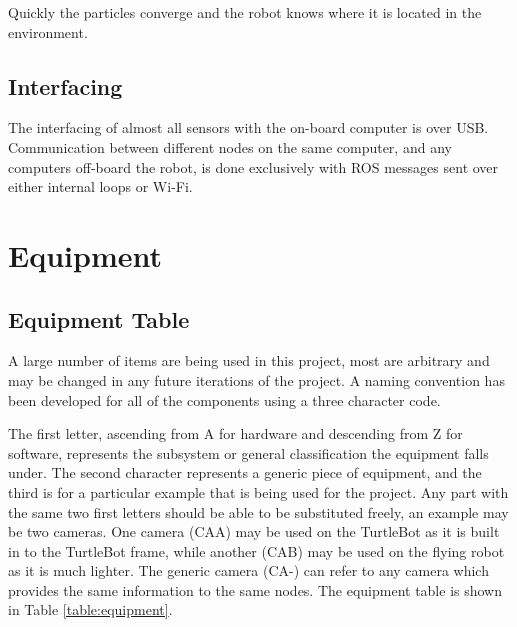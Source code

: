 \documentclass{article}[12]
\begin{document}
		Quickly the particles converge and the robot knows where it is located in the environment.

	\subsection{Interfacing}
	
	The interfacing of almost all sensors with the on-board computer is over USB. Communication between different nodes on the same computer, and any computers off-board the robot, is done exclusively with ROS messages sent over either internal loops or Wi-Fi.

\section{Equipment}

	\subsection{Equipment Table}
	
	A large number of items are being used in this project, most are arbitrary and may be changed in any future iterations of the project. A naming convention has been developed for all of the components using a three character code.
	
	The first letter, ascending from A for hardware and descending from Z for software, represents the subsystem or general classification the equipment falls under. The second character represents a generic piece of equipment, and the third is for a particular example that is being used for the project. Any part with the same two first letters should be able to be substituted freely, an example may be two cameras. One camera (CAA) may be used on the TurtleBot as it is built in to the TurtleBot frame, while another (CAB) may be used on the flying robot as it is much lighter. The generic camera (CA-) can refer to any camera which provides the same information to the same nodes. The equipment table is shown in Table \ref{table:equipment}.
	
\end{document}
